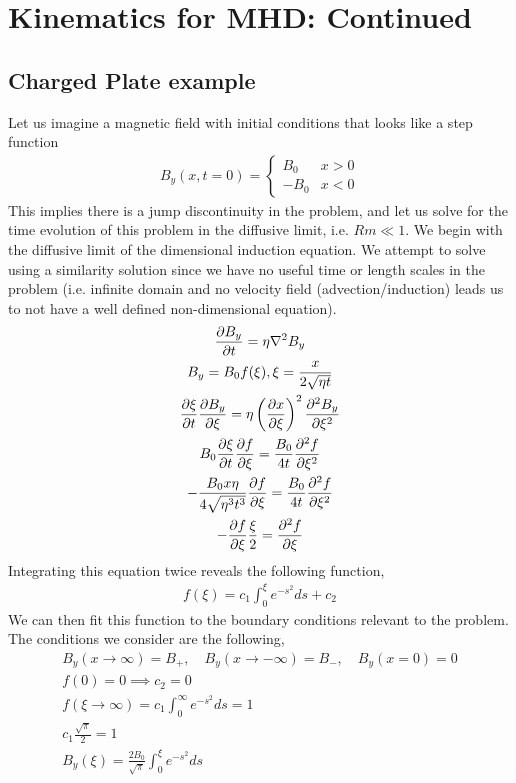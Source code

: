 \documentclass{article}
\begin{document}
\section{Kinematics for MHD: Continued}

\subsection{Charged Plate example}

Let us imagine a magnetic field with initial conditions that looks like a step
function 
\begin{gather*}
    B_y(x, t=0) = \begin{cases} B_0 & x >0\\
                                -B_0 & x < 0\end{cases}
\end{gather*}
    This implies there is a jump discontinuity in the problem, and let us solve
    for the time evolution of this problem in the diffusive limit, i.e. $Rm \ll
    1$. We begin with the diffusive limit of the dimensional induction equation.
    We attempt to solve using a similarity solution since we have no useful time
    or length scales in the problem (i.e. infinite domain and no velocity field
    (advection/induction) leads us to not have a well defined non-dimensional
    equation). 
\begin{gather*}
    \frac{\partial B_y}{\partial t} = \eta\nabla^2B_y\\
    B_y = B_0f(\xi), \xi = \frac{x}{2\sqrt{\eta t}}\\
    \frac{\partial \xi}{\partial t}\frac{\partial B_y}{\partial \xi} = \eta\left(\frac{\partial x}{\partial \xi}\right)^2\frac{\partial ^2B_y}{\partial \xi^2}\\
    B_0\frac{\partial \xi}{\partial t}\frac{\partial f}{\partial \xi} = \frac{B_0}{4t}\frac{\partial ^2f}{\partial \xi^2}\\
    -\frac{B_0x\eta}{4\sqrt{\eta^3t^3}}\frac{\partial f}{\partial \xi} =
    \frac{B_0}{4t}\frac{\partial ^2f}{\partial \xi^2}\\
    -\frac{\partial f}{\partial \xi}\frac{\xi}{2} = \frac{\partial ^2f}{\partial \xi}
\end{gather*}
Integrating this equation twice reveals the following function, 
\begin{gather*}
    f(\xi) = c_1\int_0^{\xi} e^{-s^2}ds + c_2
\end{gather*}
We can then fit this function to the boundary conditions relevant to the
problem. The conditions we consider are the following, 
\begin{gather*}
    B_y(x\to\infty) = B_+, \quad B_y(x\to-\infty) = B_-, \quad B_y(x=0) = 0\\
    f(0) = 0 \implies c_2 = 0\\
    f(\xi\to\infty) = c_1\int_0^{\infty} e^{-s^2}ds = 1\\
    c_1\frac{\sqrt{\pi}}{2} = 1\\
    B_y(\xi) = \frac{2B_0}{\sqrt{\pi}}\int_0^{\xi} e^{-s^2}ds
\end{gather*}
\end{document}
